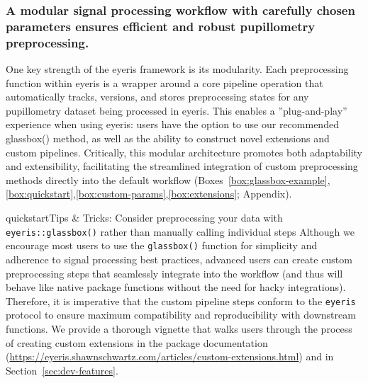 \subsubsection{A modular signal processing workflow with carefully chosen parameters ensures efficient and robust pupillometry preprocessing.}

One key strength of the eyeris framework is its modularity. Each preprocessing function within eyeris is a wrapper around a core pipeline operation that automatically tracks, versions, and stores preprocessing states for any pupillometry dataset being processed in eyeris. This enables a ”plug-and-play” experience when using eyeris: users have the option to use our recommended glassbox() method, as well as the ability to construct novel extensions and custom pipelines. Critically, this modular architecture promotes both adaptability and extensibility, facilitating the streamlined integration of custom preprocessing methods directly into the default workflow (Boxes~\ref{box:glassbox-example},\ref{box:quickstart},\ref{box:custom-params},\ref{box:extensions}; Appendix).

\begin{eyerisbox}{quickstart}{Tips \& Tricks: Consider preprocessing your data with \texttt{eyeris::glassbox()} rather than manually calling individual steps}
Although we encourage most users to use the \texttt{glassbox()} function for simplicity and adherence to signal processing best practices, advanced users can create custom preprocessing steps that seamlessly integrate into the workflow (and thus will behave like native package functions without the need for hacky integrations). Therefore, it is imperative that the custom pipeline steps conform to the \texttt{eyeris} protocol to ensure maximum compatibility and reproducibility with downstream functions. We provide a thorough vignette that walks users through the process of creating custom extensions in the package documentation (\url{https://eyeris.shawnschwartz.com/articles/custom-extensions.html}) and in Section~\ref{sec:dev-features}.
\end{eyerisbox}

